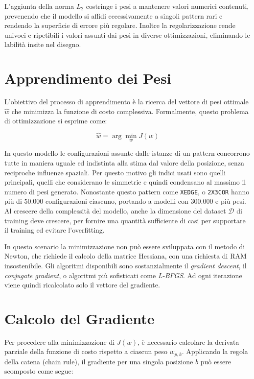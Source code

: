 L'aggiunta della norma $L_2$ costringe i pesi a mantenere valori numerici contenuti, prevenendo che il modello si affidi eccessivamente a singoli pattern rari e rendendo la superficie di errore più regolare.
Inoltre la regolarizzazione rende univoci e ripetibili i valori assunti dai pesi in diverse ottimizzazioni, eliminando le labilità insite nel disegno.

\section{Apprendimento dei Pesi}

L'obiettivo del processo di apprendimento è la ricerca del vettore di pesi ottimale $\hat{w}$ che minimizza la funzione di costo complessiva. Formalmente, questo problema di ottimizzazione si esprime come:

\begin{equation}
    \hat{w} = \arg\min_{w} J(w)
\end{equation}

In questo modello le configurazioni assunte dalle istanze di un pattern concorrono tutte in maniera uguale ed indistinta alla stima dal valore della posizione, senza reciproche influenze spaziali.
Per questo motivo gli indici usati sono quelli principali, quelli che considerano le simmetrie e quindi condensano al massimo il numero di pesi generato.
Nonostante questo pattern come \texttt{XEDGE}, o \texttt{2X3COR} hanno più di 50.000 configurazioni ciascuno, portando a modelli con 300.000 e più pesi.
Al crescere della complessità del modello, anche la dimensione del dataset $\mathcal{D}$ di training deve crescere, per fornire una quantità sufficiente di casi per supportare il training ed evitare l'overfitting.

In questo scenario la minimizzazione non può essere sviluppata con il metodo di Newton, che richiede il calcolo della matrice Hessiana, con una richiesta di RAM insostenibile.
Gli algoritmi disponibili sono sostanzialmente il \textit{gradient descent}, il \textit{conjugate gradient}, o algoritmi più sofisticati come \textit{L-BFGS}.
Ad ogni iterazione viene quindi ricalcolato solo il vettore del gradiente.

\section{Calcolo del Gradiente}

Per procedere alla minimizzazione di $J(w)$, è necessario calcolare la derivata parziale della funzione di costo rispetto a ciascun peso $w_{p,k}$. Applicando la regola della catena (chain rule), il gradiente per una singola posizione $b$ può essere scomposto come segue:

